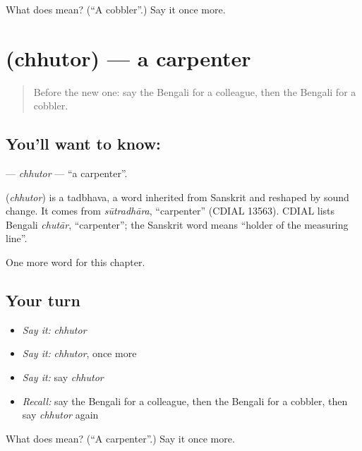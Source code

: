\begin{tcolorbox}[breakable,colback=teal!4,colframe=teal!35!black,title={Before you move on}]
What does  mean? (\textquotedblleft{}A cobbler\textquotedblright{}.) Say it once more.
\end{tcolorbox}
\section[\texorpdfstring{\bn{ছুতোর} (chhutor)}{ছুতোর (chhutor)}]{ (chhutor) — a carpenter}

\label{lesson:BN-C235-chhutor}



\begin{quote}
Before the new one: say the Bengali for a colleague, then the Bengali for a cobbler.
\end{quote}

\subsection*{You'll want to know: }
\textbf{} — \emph{chhutor} — \textquotedblleft{}a carpenter\textquotedblright{}.

\begin{cousinweb}
\textbf{} (\emph{chhutor}) is a tadbhava, a word inherited from Sanskrit and reshaped by sound change. It comes from \emph{sūtradhāra}, \textquotedblleft{}carpenter\textquotedblright{} (CDIAL 13563). CDIAL lists Bengali \emph{chutār}, \textquotedblleft{}carpenter\textquotedblright{}; the Sanskrit word means \textquotedblleft{}holder of the measuring line\textquotedblright{}.
\end{cousinweb}

\begin{grammarlens}[title={What you've built}]
One more word for this chapter.
\end{grammarlens}

\subsection*{Your turn}
\begin{itemize}
\raggedright
  \item \emph{Say it:} \emph{chhutor}
  \item \emph{Say it:} \emph{chhutor}, once more
  \item \emph{Say it:} say \emph{chhutor}
  \item \emph{Recall:} say the Bengali for a colleague, then the Bengali for a cobbler, then say \emph{chhutor} again
\end{itemize}

\begin{tcolorbox}[breakable,colback=teal!4,colframe=teal!35!black,title={Before you move on}]
What does  mean? (\textquotedblleft{}A carpenter\textquotedblright{}.) Say it once more.
\end{tcolorbox}
